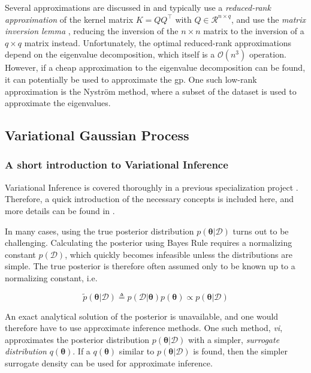 Several approximations are discussed in \cite{rasmussen} and typically use a \textit{reduced-rank approximation} of the kernel matrix $K=Q Q^\intercal$ with $Q \in \mathcal{R}^{n \times q}$, and use the \textit{matrix inversion lemma} \cite[p.~201]{rasmussen}, reducing the inversion of the $n \times n$ matrix to the inversion of a $q \times q$ matrix instead. Unfortunately, the optimal reduced-rank approximations depend on the eigenvalue decomposition, which itself is a $\mathcal{O}(n^3)$ operation. However, if a cheap approximation to the eigenvalue decomposition can be found, it can potentially be used to approximate the \acrshort{gp}. One such low-rank approximation is the Nyström method, where a subset of the dataset is used to approximate the eigenvalues.    

\subsection{Variational Gaussian Process}

\subsubsection{A short introduction to Variational Inference}
Variational Inference is covered thoroughly in a previous specialization project \cite{mellbye}. Therefore, a quick introduction of the necessary concepts is included here, and more details can be found in \cite{mellbye, murphy}.

In many cases, using the true posterior distribution $p(\boldsymbol{\theta} | \mathcal{D})$ turns out to be challenging. Calculating the posterior using Bayes Rule requires a normalizing constant $p(\mathcal{D})$, which quickly becomes infeasible unless the distributions are simple. The true posterior is therefore often assumed only to be known up to a normalizing constant, i.e.

\begin{equation}
    \tilde{p}(\boldsymbol{\theta} | \mathcal{D}) \triangleq p(\mathcal{D} | \boldsymbol{\theta})p(\boldsymbol{\theta}) \propto p(\boldsymbol{\theta} | \mathcal{D})
\end{equation}

An exact analytical solution of the posterior is unavailable, and one would therefore have to use approximate inference methods. 
One such method, \textit{\acrfull{vi}}, approximates the posterior distribution $p(\boldsymbol{\theta} | \mathcal{D})$ with a simpler, \textit{surrogate distribution} $q(\boldsymbol{\theta})$. If a $q(\boldsymbol{\theta})$ similar to $p(\boldsymbol{\theta} | \mathcal{D})$ is found, then the simpler surrogate density can be used for approximate inference.


